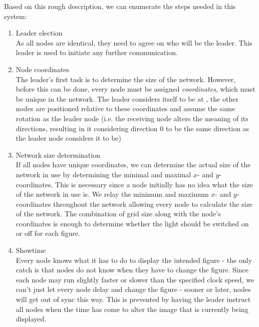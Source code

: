 Based on this rough description, we can enumerate the steps needed in this system:

\begin{enumerate}
\item Leader election \\
As all nodes are identical, they need to agree on who will be the leader. This leader is used to initiate any further communication.
\item Node coordinates \\
The leader's first task is to determine the size of the network. However, before this can be done, every node must be assigned \emph{coordinates}, which must be unique in the network. The leader considers itself to be at , the other nodes are positioned relative to these coordinates and assume the same rotation as the leader node (i.e. the receiving node alters the meaning of its directions, resulting in it considering direction $0$ to be the same direction as the leader node considers it to be)
\item Network size determination \\
If all nodes have unique coordinates, we can determine the actual size of the network in use by determining the minimal and maximal $x$- and $y$-coordinates. This is necessary since a node initially has no idea what the size of the network in use is. We relay the minimum and maximum $x$- and $y$-coordinates throughout the network allowing every node to calculate the size of the network. The combination of grid size along with the node's coordinates is enough to determine whether the light should be switched on or off for each figure.
\item Showtime \\
Every node knows what it has to do to display the intended figure - the only catch is that nodes do not know when they have to change the figure. Since each node may run slightly faster or slower than the specified clock speed, we can't just let every node delay and change the figure - sooner or later, nodes will get out of sync this way. This is prevented by having the leader instruct all nodes when the time has come to alter the image that is currently being displayed.
\end{enumerate}

